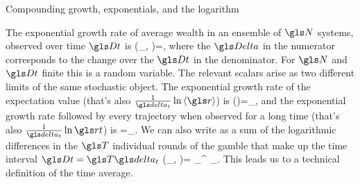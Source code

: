 \begin{excursion}{Compounding growth, exponentials, and the logarithm}
%
\end{excursion}

The exponential growth rate of average wealth in an ensemble of $\N$ systems, observed over time $\Dt$ is
\be
\gm(\ave{\x(\t)}_\N, \Dt)=\frac{\D \ln \ave{\x}_\N}{\Dt},
\ee
where the $\D$ in the numerator corresponds to the change over the $\Dt$ in the denominator. For $\N$ and $\Dt$ finite this is a random variable. The relevant scalars arise as two different limits
of the same stochastic object. The exponential growth rate of the expectation value 
(that's also $\frac{1}{\dt} \ln \ave{\gr}$) is
\be
\gm(\ave{\x})=\lim_{\N\to\infty}\gm,
\ee
and the exponential growth rate followed by every trajectory when
observed for a long time (that's also $\frac{1}{\dt} \ln \rt$) is 
\be
\gt=\lim_{\Dt\to\infty}\gm.
\ee
We can also write  as a sum of the logarithmic differences in  the 
$\T$ individual rounds of the gamble that make up the time interval 
$\Dt=\T \dt$
\be
\gm(\ave{\x(\t)}_\N, \Dt)=  \sum_{}^{\T} \D\ln \ave{\x(\t+\gtau\dt)}_\N.
\ee
This leads us to a technical definition of the time average.

